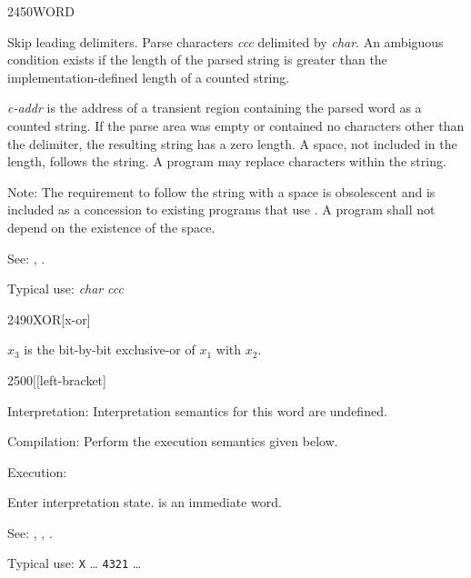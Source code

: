\begin{newword}{2450}{WORD}

	Skip leading delimiters. Parse characters \emph{ccc} delimited
	by \emph{char}.  An ambiguous condition exists if the length of
	the parsed string is greater than the implementation-defined
	length of a counted string.

	\emph{c-addr} is the address of a transient region containing
	the parsed word as a counted string. If the parse area was
	empty or contained no characters other than the delimiter, the
	resulting string has a zero length. A space, not included in the
	length, follows the string. A program may replace characters
	within the string.

\item[Note:]
	The requirement to follow the string with a space is obsolescent
	and is included as a concession to existing programs that use
	. A program shall not depend on the existence of
	the space.

\item[See:]
	,
	.

	\begin{rationale} %
		Typical use: \emph{char}  \emph{ccc}
	\end{rationale}
\end{newword}


\begin{newword}{2490}{XOR}[x-or]

	$x_3$ is the bit-by-bit exclusive-or of $x_1$ with $x_2$.
\end{newword}


\begin{newword*}{2500}{[}[left-bracket]
\item[Interpretation:]
	Interpretation semantics for this word are undefined.

\item[Compilation:]
	Perform the execution semantics given below.

\item[Execution:]
	\stack{}{}

	Enter interpretation state. \word{[} is an immediate word.

\item[See:]
	,
	,
	\wref{core:]}{]}.

	\begin{rationale} %
		Typical use:
			\word{:} \texttt{X} {\ldots}
				\word{[} \texttt{4321} \word{]} 
			{\ldots} \word{;}
	\end{rationale}
\end{newword*}


